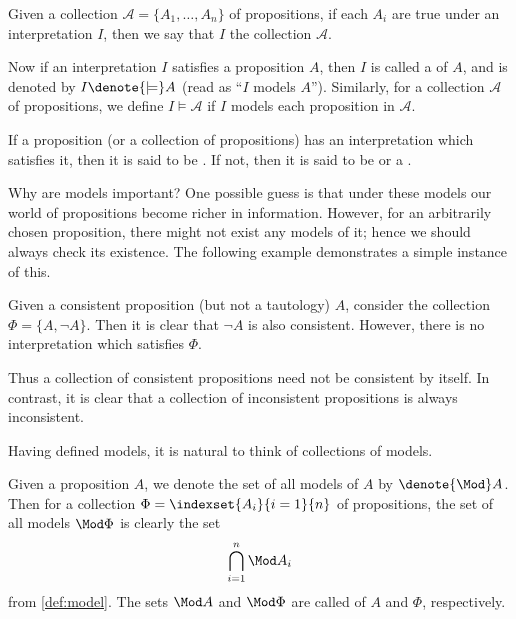 \begin{definition}[Models]
    \label{def:model}
    Given a collection \(\mathcal A=\{A_1,\dots,A_n\}\) of propositions,
    if each \(A_i\) are true under an interpretation \(I\),
    then we say that
    \(I\)  the collection \(\mathcal A\).

    Now if an interpretation \(I\) satisfies a proposition \(A\),
    then \(I\) is called a  of \(A\),
    and is denoted by \(I\denote{\models} A\)
    (read as ``\(I\) models \(A\)'').
    Similarly, for a collection \(\mathcal A\) of propositions,
    we define \(I\models\mathcal A\)
    if \(I\) models each proposition in \(\mathcal A\).

    If a proposition (or a collection of propositions)
    has an interpretation which satisfies it,
    then it is said to be .
    If not, then it is said to be 
    or a .
\end{definition}

Why are models important?
One possible guess is that
under these models
our world of propositions become richer in information.
However,
for an arbitrarily chosen proposition,
there might not exist any models of it;
hence we should always check its existence.
The following example demonstrates a simple instance of this.

\begin{example}
    \label{exm:satisfy}
    Given a consistent proposition (but not a tautology) \(A\),
    consider the collection \(\Phi=\{A,\neg A\}\).
    Then it is clear that \(\neg A\) is also consistent.
    However, there is no interpretation which satisfies \(\Phi\).
\end{example}

Thus a collection of consistent propositions
need not be consistent by itself.
In contrast, it is clear that
a collection of inconsistent propositions
is always inconsistent.

Having defined models,
it is natural to think of collections of models.

\begin{definition}
    \label{def:modelset}
    Given a proposition \(A\),
    we denote the set of all models of \(A\) by \(\denote{\Mod} A\).
    Then for a collection \(\Phi=\indexset{A_i}{i=1}{n}\)
    of propositions,
    the set of all models \(\Mod\Phi\) is clearly the set
    \[
        \bigcap_{i=1}^n\Mod A_i
    \]
    from \cref{def:model}.
    The sets \(\Mod A\) and \(\Mod\Phi\) are called
     of \(A\) and \(\Phi\), respectively.
\end{definition}

